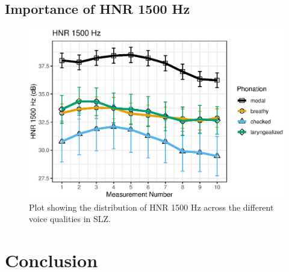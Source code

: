 \subsection{Importance of HNR 1500 Hz} \label{sec:bagging_hnr}

\begin{figure}[!h]
    \centering
    \includegraphics[width = 0.9\linewidth]{images/slz_hnr15.eps}
    \caption{Plot showing the distribution of HNR 1500 Hz across the different voice qualities in SLZ.}
    \label{fig:hnr1500}
\end{figure}

\section{Conclusion} \label{sec:bagging_conclusion}


